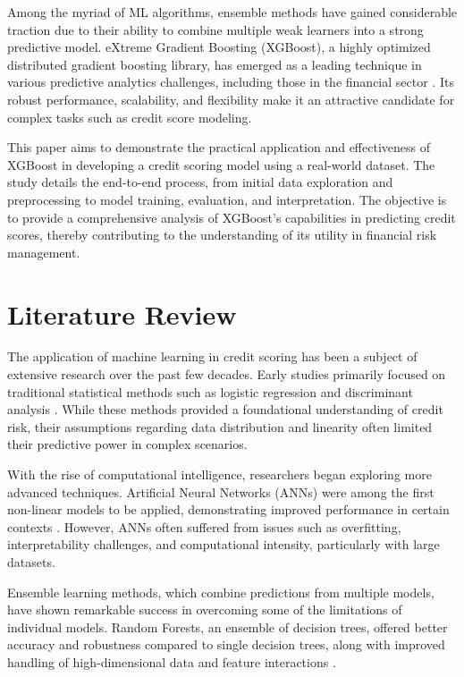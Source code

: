 \documentclass{article}
\begin{document}
Among the myriad of ML algorithms, ensemble methods have gained considerable traction due to their ability to combine multiple weak learners into a strong predictive model. eXtreme Gradient Boosting (XGBoost), a highly optimized distributed gradient boosting library, has emerged as a leading technique in various predictive analytics challenges, including those in the financial sector \cite{chen2016xgboost}. Its robust performance, scalability, and flexibility make it an attractive candidate for complex tasks such as credit score modeling.

This paper aims to demonstrate the practical application and effectiveness of XGBoost in developing a credit scoring model using a real-world dataset. The study details the end-to-end process, from initial data exploration and preprocessing to model training, evaluation, and interpretation. The objective is to provide a comprehensive analysis of XGBoost's capabilities in predicting credit scores, thereby contributing to the understanding of its utility in financial risk management.

\section{Literature Review}

The application of machine learning in credit scoring has been a subject of extensive research over the past few decades. Early studies primarily focused on traditional statistical methods such as logistic regression and discriminant analysis \cite{thomas2002credit}. While these methods provided a foundational understanding of credit risk, their assumptions regarding data distribution and linearity often limited their predictive power in complex scenarios.

With the rise of computational intelligence, researchers began exploring more advanced techniques. Artificial Neural Networks (ANNs) were among the first non-linear models to be applied, demonstrating improved performance in certain contexts \cite{west2000neural}. However, ANNs often suffered from issues such as overfitting, interpretability challenges, and computational intensity, particularly with large datasets.

Ensemble learning methods, which combine predictions from multiple models, have shown remarkable success in overcoming some of the limitations of individual models. Random Forests, an ensemble of decision trees, offered better accuracy and robustness compared to single decision trees, along with improved handling of high-dimensional data and feature interactions \cite{breiman2001random}.
\end{document}

